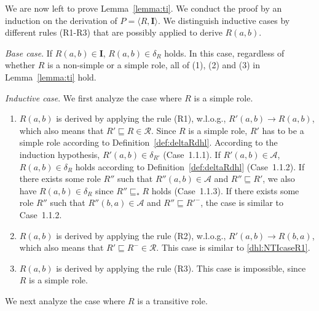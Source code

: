 We are now left to prove Lemma~\ref{lemma:ti}. We conduct the proof by an induction on
the derivation of $P=\langle R,\textbf{I}\rangle$. We distinguish inductive cases by different rules (R1-R3)
that are possibly applied to derive $R(a,b)$.

\emph{Base case}. If $R(a,b)\in\textbf{I}$, $R(a,b)\in\delta_{R}$ holds. In this case,
regardless of whether $R$ is a non-simple or a simple role, all of (1), (2) and (3) in Lemma~\ref{lemma:ti} hold.

\emph{Inductive case}. We first analyze the case where $R$ is a simple role.

\begin{enumerate}[leftmargin=12ex,label=Case~1.\arabic*, ref=Case~1.\arabic*]
\item $R(a,b)$ is derived by applying the rule (R1), w.l.o.g., $R'(a,b)\rightarrow R(a,b)$,
    which also means that $R'\sqsubseteq R\in\mathcal{R}$. Since $R$ is a simple role, $R'$ has to
    be a simple role according to Definition~\ref{def:deltaRdhl}. According to the induction hypothesis,
    $R'(a,b)\in\delta_{R'}$ (Case~1.1.1). If $R'(a,b)\in\mathcal{A}$, $R(a,b)\in\delta_{R}$
    holds according to Definition~\ref{def:deltaRdhl} (Case~1.1.2). If there exists some
    role $R''$ such that $R''(a,b)\in\mathcal{A}$ and $R''\sqsubseteq R'$, we also have
    $R(a,b)\in\delta_{R}$ since $R''\sqsubseteq_* R$ holds (Case~1.1.3). If there exists some
    role $R''$ such that $R''(b,a)\in\mathcal{A}$ and $R''\sqsubseteq R'^-$, the case is
    similar to Case~1.1.2.\label{dhl:NTIcaseR1}

\item $R(a,b)$ is derived by applying the rule (R2), w.l.o.g., $R'(a,b)\rightarrow R(b,a)$,
    which also means that $R'\sqsubseteq R^-\in\mathcal{R}$. This case is similar
    to \ref{dhl:NTIcaseR1}.\label{dhl:NTIcaseR2}

\item $R(a,b)$ is derived by applying the rule (R3). This case is impossible, since $R$ is
    a simple role.
\end{enumerate}

We next analyze the case where $R$ is a transitive role.

